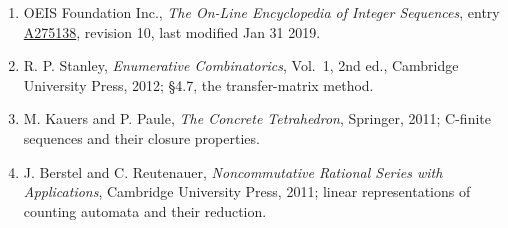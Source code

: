 \documentclass[11pt]{article}
\theoremstyle{definition}
\begin{document}
\begin{enumerate}

\item OEIS Foundation Inc., \emph{The On-Line Encyclopedia of Integer Sequences}, entry \href{https://oeis.org/A275138}{A275138}, revision 10, last modified Jan 31 2019.

\item R. P. Stanley, \emph{Enumerative Combinatorics}, Vol.~1, 2nd ed., Cambridge University Press, 2012; \S4.7, the transfer-matrix method.

\item M. Kauers and P. Paule, \emph{The Concrete Tetrahedron}, Springer, 2011; C-finite sequences and their closure properties.

\item J. Berstel and C. Reutenauer, \emph{Noncommutative Rational Series with Applications}, Cambridge University Press, 2011; linear representations of counting automata and their reduction.

\end{enumerate}
\end{document}
